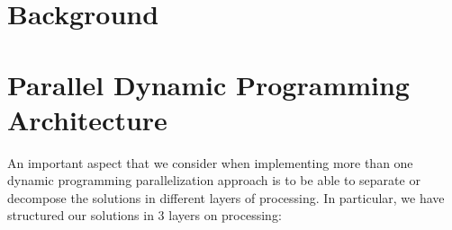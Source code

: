 \documentclass[journal]{IEEEtran}
\begin{document}





\section{Background}






\section{Parallel Dynamic Programming Architecture}

An important aspect that we consider when implementing more than one dynamic programming parallelization approach is to be able to separate or decompose the solutions in different layers of processing. In particular, we have structured our solutions in 3 layers on processing:
\end{document}
